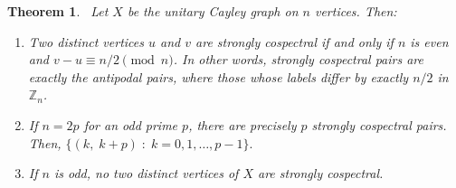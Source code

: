 \documentclass[12pt]{amsart}
\newtheorem{theorem}{Theorem}[section]
\begin{document}
\begin{theorem}~\label{Thm4cospectral}
Let $X$ be the unitary Cayley graph on $n$ vertices. Then:
  \begin{enumerate}
    \item   Two distinct vertices $u$ and $v$ are strongly cospectral    if and only if $n$ is even and $v - u \equiv n/2 \pmod{n}$. In other words, strongly
    cospectral pairs are exactly the \emph{antipodal pairs}, where those whose labels differ
    by exactly $n/2$ in $\mathbb{Z}_n$.

    \item  If  $n=2p$ for an odd prime $p$, there are
    precisely $p$ strongly cospectral pairs. Then, $\bigl\{(k,\; k+p) \;:\; k = 0, 1, \ldots, p-1\bigr\}.$

    \item If  $n$ is odd, no two distinct vertices of $X$ are
    strongly cospectral.
  \end{enumerate}
\end{theorem}
\end{document}
